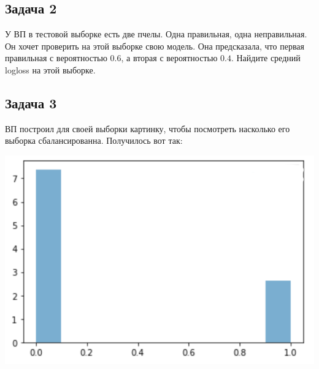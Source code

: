 \documentclass[12pt, a4paper, oneside]{article}
\begin{document}
\subsection*{Задача 2}

У ВП в тестовой выборке есть две пчелы. Одна правильная, одна неправильная.  Он хочет проверить на этой выборке свою модель. Она предсказала, что первая правильная с вероятностью $0.6$, а вторая с вероятностью $0.4$. Найдите средний logloss на этой выборке. 



\subsection*{Задача 3}

ВП построил для своей выборки картинку, чтобы посмотреть насколько его выборка сбалансированна. Получилось вот так: 

\begin{center}
	\includegraphics[scale=0.25]{balance_logloss.png}
\end{center}
\end{document}
